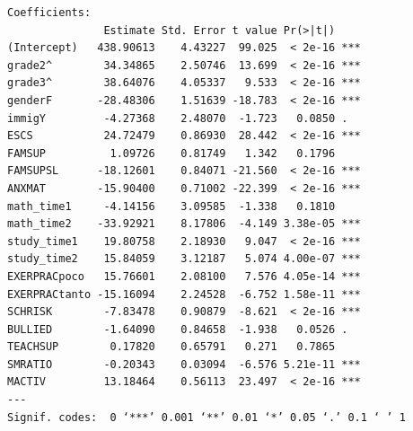 \documentclass{beamer}
\begin{document}
\begin{frame}[fragile]

{\tiny
\begin{verbatim}
Coefficients:
               Estimate Std. Error t value Pr(>|t|)    
(Intercept)   438.90613    4.43227  99.025  < 2e-16 ***
grade2^        34.34865    2.50746  13.699  < 2e-16 ***
grade3^        38.64076    4.05337   9.533  < 2e-16 ***
genderF       -28.48306    1.51639 -18.783  < 2e-16 ***
immigY         -4.27368    2.48070  -1.723   0.0850 .  
ESCS           24.72479    0.86930  28.442  < 2e-16 ***
FAMSUP          1.09726    0.81749   1.342   0.1796    
FAMSUPSL      -18.12601    0.84071 -21.560  < 2e-16 ***
ANXMAT        -15.90400    0.71002 -22.399  < 2e-16 ***
math_time1     -4.14156    3.09585  -1.338   0.1810    
math_time2    -33.92921    8.17806  -4.149 3.38e-05 ***
study_time1    19.80758    2.18930   9.047  < 2e-16 ***
study_time2    15.84059    3.12187   5.074 4.00e-07 ***
EXERPRACpoco   15.76601    2.08100   7.576 4.05e-14 ***
EXERPRACtanto -15.16094    2.24528  -6.752 1.58e-11 ***
SCHRISK        -7.83478    0.90879  -8.621  < 2e-16 ***
BULLIED        -1.64090    0.84658  -1.938   0.0526 .  
TEACHSUP        0.17820    0.65791   0.271   0.7865    
SMRATIO        -0.20343    0.03094  -6.576 5.21e-11 ***
MACTIV         13.18464    0.56113  23.497  < 2e-16 ***
---
Signif. codes:  0 ‘***’ 0.001 ‘**’ 0.01 ‘*’ 0.05 ‘.’ 0.1 ‘ ’ 1
\end{verbatim}
}
\end{frame}






\end{document}
